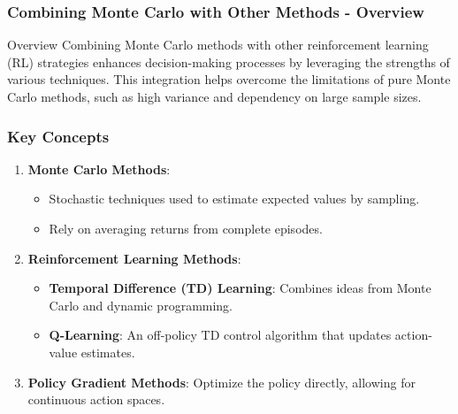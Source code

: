 \documentclass[aspectratio=169]{beamer}
\begin{document}
\begin{frame}[fragile]
    \frametitle{Combining Monte Carlo with Other Methods - Overview}
    \begin{block}{Overview}
        Combining Monte Carlo methods with other reinforcement learning (RL) strategies enhances decision-making processes by leveraging the strengths of various techniques. This integration helps overcome the limitations of pure Monte Carlo methods, such as high variance and dependency on large sample sizes.
    \end{block}
\end{frame}

\begin{frame}[fragile]
    \frametitle{Key Concepts}
    \begin{enumerate}
        \item \textbf{Monte Carlo Methods}: 
            \begin{itemize}
                \item Stochastic techniques used to estimate expected values by sampling.
                \item Rely on averaging returns from complete episodes.
            \end{itemize}
        \item \textbf{Reinforcement Learning Methods}:
            \begin{itemize}
                \item \textbf{Temporal Difference (TD) Learning}: Combines ideas from Monte Carlo and dynamic programming.
                \item \textbf{Q-Learning}: An off-policy TD control algorithm that updates action-value estimates.
            \end{itemize}
        \item \textbf{Policy Gradient Methods}: Optimize the policy directly, allowing for continuous action spaces.
    \end{enumerate}
\end{frame}
\end{document}
